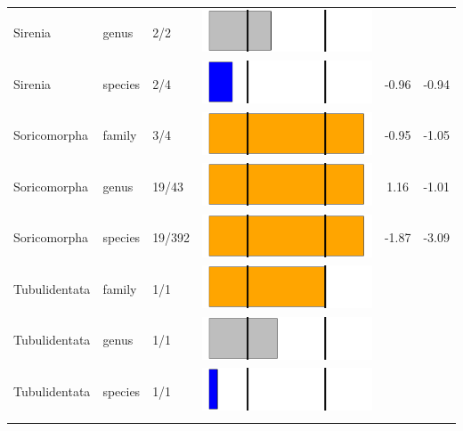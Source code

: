 \begin{longtable}{lL{1.8cm}C{2cm}lcc}
  Sirenia & genus & 2/2 & \includegraphics[width=0.20\linewidth, height=0.05\linewidth]{Table_figures/bar77.pdf} &   &   \\ 
  Sirenia & species & 2/4 & \includegraphics[width=0.20\linewidth, height=0.05\linewidth]{Table_figures/bar78.pdf} & -0.96 & -0.94 \\ 
  Soricomorpha & family & 3/4 & \includegraphics[width=0.20\linewidth, height=0.05\linewidth]{Table_figures/bar79.pdf} & -0.95 & -1.05 \\ 
  Soricomorpha & genus & 19/43 & \includegraphics[width=0.20\linewidth, height=0.05\linewidth]{Table_figures/bar80.pdf} & 1.16 & -1.01 \\ 
  Soricomorpha & species & 19/392 & \includegraphics[width=0.20\linewidth, height=0.05\linewidth]{Table_figures/bar81.pdf} & -1.87 & -3.09 \\ 
  Tubulidentata & family & 1/1 & \includegraphics[width=0.20\linewidth, height=0.05\linewidth]{Table_figures/bar82.pdf} &   &   \\ 
  Tubulidentata & genus & 1/1 & \includegraphics[width=0.20\linewidth, height=0.05\linewidth]{Table_figures/bar83.pdf} &   &   \\ 
  Tubulidentata & species & 1/1 & \includegraphics[width=0.20\linewidth, height=0.05\linewidth]{Table_figures/bar84.pdf} &   &   \\ 
   \hline
\hline
\label{Table_results}
\end{longtable}
